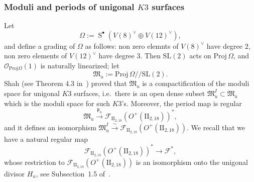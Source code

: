\documentclass[11pt]{amsart}
\numberwithin{equation}{section}
\theoremstyle{plain}
\theoremstyle{remark}
\theoremstyle{definition}
\newcommand{\cF}{\mathscr{F}}
\newcommand{\gp}{\mathfrak{p}}
\newcommand{\SL}{\mathrm{SL}}
\newcommand{\Proj}{\mathrm{Proj}}
\newcommand{\gquot}{/\!\!/}
\newcommand{\II}{\textrm{II}}
\newcommand{\cO}{{\mathscr O}}
\newcommand{\gM}{\mathfrak{M}}
\newcommand{\lra}{\longrightarrow}
\DeclareMathOperator{\Symm}{S}
\begin{document}
\subsubsection{Moduli and periods of unigonal $K3$ surfaces}\label{subsubsec:modunig}
%
Let 
%
\begin{equation}\label{eccomega}
%
\Omega:=\Symm^{\bullet}(V(8)^{\vee}\oplus V(12)^{\vee}), 
%
\end{equation}
%
and define a grading of $\Omega$ as follows: non zero elemnts of $V(8)^{\vee}$ have degree $2$, non zero elements of $V(12)^{\vee}$ have degree $3$. Then $\SL(2)$ acts on $\Proj\,\Omega$, and $\cO_{\Proj\Omega}(1)$ is naturally linearized; let 
%
\begin{equation}\label{gitunig}
%
\gM_u:=\Proj\,\Omega\gquot\SL(2).
%
\end{equation}
%
Shah (see Theorem 4.3 in~\cite{shah}) proved that $\gM_u$ is a compactification of the moduli space for unigonal $K3$ surfaces, i.e.~there is an open dense subset  $\gM_u^{I}\subset\gM_u$ which is the moduli space for such $K3$'s. Moreover, the period map is regular
%
\begin{equation}\label{perunig}
%
\gM_u \overset{\gp_u}{\lra} \cF_{\II_{2,18}}(O^{+}(\II_{2,18}))^{*},
%
\end{equation}
%
and  it  defines  an isomorphism $\gM_u^{I}\overset{\sim}{\lra} \cF_{\II_{2,18}}(O^{+}(\II_{2,18}))$. We recall that we have a natural regular map 
%
\begin{equation}\label{unigbb}
%
 \cF_{\II_{2,18}}(O^{+}(\II_{2,18}))^{*}\lra \cF^{*},
%
\end{equation}
%
whose restriction to $ \cF_{\II_{2,18}}(O^{+}(\II_{2,18}))$ is an isomorphism onto the 
 unigonal divisor $H_u$, see Subsection~1.5 of~\cite{log1}.
%
\end{document}
